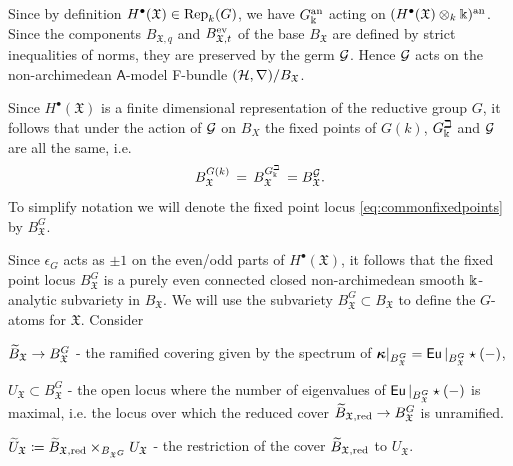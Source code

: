 \documentclass[twoside,leqno]{article}
\numberwithin{equation}{section}
\theoremstyle{plain}
\theoremstyle{definition}
\begin{document}
Since by definition $H^{\bullet}(\mathfrak{X}) \in \operatorname{Rep}_{k}(G)$, we have $G_\Bbbk^{\mathrm{an}}$ acting on $(H^{\bullet}(\mathfrak{X})\otimes_{k} \Bbbk)^{\operatorname{an}}$.
Since the components $B_{\mathfrak{X},q}$ and $B_{\mathfrak{X},t}^{\mathrm{ev}}$ of the base $B_{\mathfrak{X}}$ are defined by strict inequalities of norms, they are preserved by the germ $\mathcal{G}$.
Hence $\mathcal{G}$ acts on the non-archimedean $\mathsf{A}$-model F-bundle $(\mathcal H,\nabla)/B_{\mathfrak{X}}$.

Since $H^{\bullet}(\mathfrak{X})$ is a finite dimensional representation of the reductive group $G$, it follows that under the action of $\mathcal{G}$ on $B_{X}$ the fixed points of $G(k)$, $G_\Bbbk^\beth$ and $\mathcal{G}$ are all the same, i.e.\ 
\begin{equation} \label{eq:commonfixedpoints}
B_{\mathfrak{X}}^{G(k)} \, = \, B_{\mathfrak{X}}^{G_\Bbbk^\beth} \, = B_{\mathfrak{X}}^{\mathcal{G}}.
\end{equation}
To simplify notation we will denote the fixed point locus \eqref{eq:commonfixedpoints} by 
$B^G_{\mathfrak{X}}$. 

\medskip


Since $\epsilon_{G}$ acts as $\pm 1$ on the even/odd parts of $H^{\bullet}(\mathfrak{X})$, it follows that the fixed point locus  $B^G_{\mathfrak{X}}$  is a purely even connected closed non-archimedean smooth $\Bbbk$-analytic subvariety in $B_{\mathfrak{X}}$.  We will use the subvariety $B^G_{\mathfrak{X}} \subset B_{\mathfrak{X}}$ to define the $G$-atoms for $\mathfrak{X}$.
Consider

\begin{description}
    \item $\widetilde{B}_{\mathfrak{X}} \to B^{G}_{\mathfrak{X}}$ - the ramified covering given by the spectrum of $\boldsymbol{\kappa}|_{B^{G}_{\mathfrak{X}}} = \operatorname{\mathsf{Eu}}|_{B^{G}_{\mathfrak{X}}}\star(-)$,
    \item $U_{\mathfrak{X}} \subset B^G_{\mathfrak{X}}$ - the open locus where the number of eigenvalues of $\operatorname{\mathsf{Eu}}|_{B^{G}_{\mathfrak{X}}}\star(-)$ is maximal, i.e. the locus over which 
    the reduced cover $\widetilde{B}_{\mathfrak{X},\operatorname{red}} \to  B^{G}_{\mathfrak{X}}$ is unramified.
    \item $\widetilde U_\mathfrak{X} \coloneqq \widetilde{B}_{\mathfrak{X},\operatorname{red}} \times_{B_{\mathfrak{X}^{G}}} U_{\mathfrak{X}}$ - the restriction of the cover $\widetilde{B}_{\mathfrak{X},\operatorname{red}}$ to $U_{\mathfrak{X}}$.
\end{description}
\end{document}
